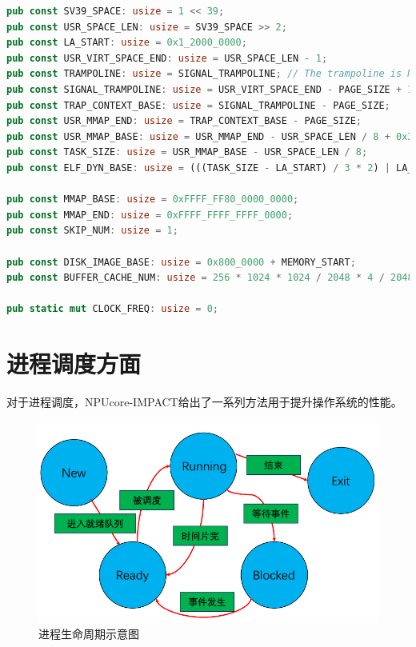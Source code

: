 \begin{lstlisting}[language={rust}, label={code:config},
    caption={os/src/arch/la64/config.rs}]
pub const SV39_SPACE: usize = 1 << 39;
pub const USR_SPACE_LEN: usize = SV39_SPACE >> 2;
pub const LA_START: usize = 0x1_2000_0000;
pub const USR_VIRT_SPACE_END: usize = USR_SPACE_LEN - 1;
pub const TRAMPOLINE: usize = SIGNAL_TRAMPOLINE; // The trampoline is NOT mapped in LA.
pub const SIGNAL_TRAMPOLINE: usize = USR_VIRT_SPACE_END - PAGE_SIZE + 1;
pub const TRAP_CONTEXT_BASE: usize = SIGNAL_TRAMPOLINE - PAGE_SIZE;
pub const USR_MMAP_END: usize = TRAP_CONTEXT_BASE - PAGE_SIZE;
pub const USR_MMAP_BASE: usize = USR_MMAP_END - USR_SPACE_LEN / 8 + 0x3000;
pub const TASK_SIZE: usize = USR_MMAP_BASE - USR_SPACE_LEN / 8;
pub const ELF_DYN_BASE: usize = (((TASK_SIZE - LA_START) / 3 * 2) | LA_START) \& (!(PAGE_SIZE - 1));

pub const MMAP_BASE: usize = 0xFFFF_FF80_0000_0000;
pub const MMAP_END: usize = 0xFFFF_FFFF_FFFF_0000;
pub const SKIP_NUM: usize = 1;

pub const DISK_IMAGE_BASE: usize = 0x800_0000 + MEMORY_START;
pub const BUFFER_CACHE_NUM: usize = 256 * 1024 * 1024 / 2048 * 4 / 2048;

pub static mut CLOCK_FREQ: usize = 0;
\end{lstlisting}


\section{进程调度方面}
对于进程调度，NPUcore-IMPACT给出了一系列方法用于提升操作系统的性能。

\begin{figure}
    \centering
    \label{fig:pro}
    \includegraphics[width=1\linewidth]{figs/Proc.PNG}
    \caption{进程生命周期示意图}
\end{figure}

